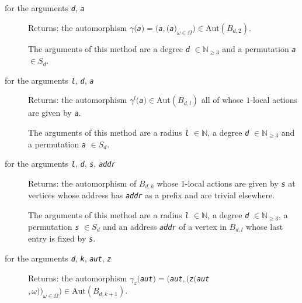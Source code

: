 \documentclass[a4paper,11pt]{report}
\begin{document}
{{{ 

 
\begin{description}
\item[{for the arguments \mbox{\texttt{\mdseries\slshape d}}, \mbox{\texttt{\mdseries\slshape a}}}]  Returns: the automorphism $\gamma($\mbox{\texttt{\mdseries\slshape a}}$)=($\mbox{\texttt{\mdseries\slshape a}}$,($\mbox{\texttt{\mdseries\slshape a}}$)_{\omega\in\Omega})\in\mathrm{Aut}(B_{d,2})$. 

 The arguments of this method are a degree \mbox{\texttt{\mdseries\slshape d}} $\in\mathbb{N}_{\ge 3}$ and a permutation \mbox{\texttt{\mdseries\slshape a}} $\in S_d$. 
\item[{for the arguments \mbox{\texttt{\mdseries\slshape l}}, \mbox{\texttt{\mdseries\slshape d}}, \mbox{\texttt{\mdseries\slshape a}}}]  Returns: the automorphism $\gamma^{l}($\mbox{\texttt{\mdseries\slshape a}}$)\in\mathrm{Aut}(B_{d,l})$ all of whose $1$-local actions are given by \mbox{\texttt{\mdseries\slshape a}}. 

 The arguments of this method are a radius \mbox{\texttt{\mdseries\slshape l}} $\in\mathbb{N}$, a degree \mbox{\texttt{\mdseries\slshape d}} $\in\mathbb{N}_{\ge 3}$ and a permutation \mbox{\texttt{\mdseries\slshape a}} $\in S_d$. 
\item[{for the arguments \mbox{\texttt{\mdseries\slshape l}}, \mbox{\texttt{\mdseries\slshape d}}, \mbox{\texttt{\mdseries\slshape s}}, \mbox{\texttt{\mdseries\slshape addr}}}]  Returns: the automorphism of $B_{d,k}$ whose $1$-local actions are given by \mbox{\texttt{\mdseries\slshape s}} at vertices whose address has \mbox{\texttt{\mdseries\slshape addr}} as a prefix and are trivial elsewhere. 

 The arguments of this method are a radius \mbox{\texttt{\mdseries\slshape l}} $\in\mathbb{N}$, a degree \mbox{\texttt{\mdseries\slshape d}} $\in\mathbb{N}_{\ge 3}$, a permutation \mbox{\texttt{\mdseries\slshape s}} $\in S_d$ and an address \mbox{\texttt{\mdseries\slshape addr}} of a vertex in $B_{d,l}$ whose last entry is fixed by \mbox{\texttt{\mdseries\slshape s}}. 
\item[{for the arguments \mbox{\texttt{\mdseries\slshape d}}, \mbox{\texttt{\mdseries\slshape k}}, \mbox{\texttt{\mdseries\slshape aut}}, \mbox{\texttt{\mdseries\slshape z}}}]  Returns: the automorphism $\gamma_{z}($\mbox{\texttt{\mdseries\slshape aut}}$)=($\mbox{\texttt{\mdseries\slshape aut}}$,($\mbox{\texttt{\mdseries\slshape z}}$($\mbox{\texttt{\mdseries\slshape aut}}$,\omega))_{\omega\in\Omega})\in\mathrm{Aut}(B_{d,k+1})$. 


\end{description}}}}
\end{document}
